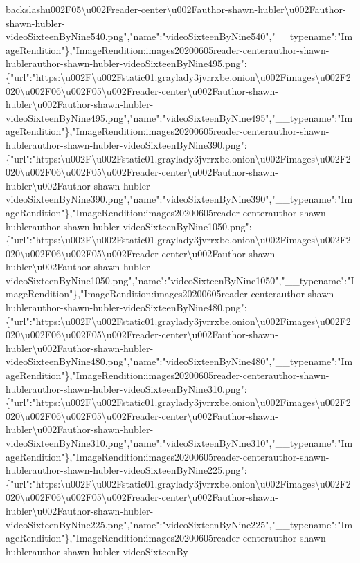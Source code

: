 backslash{}u002F05\textbackslash{}u002Freader-center\textbackslash{}u002Fauthor-shawn-hubler\textbackslash{}u002Fauthor-shawn-hubler-videoSixteenByNine540.png","name":"videoSixteenByNine540","\_\_typename":"ImageRendition"\},"ImageRendition:images20200605reader-centerauthor-shawn-hublerauthor-shawn-hubler-videoSixteenByNine495.png":\{"url":"https:\textbackslash{}u002F\textbackslash{}u002Fstatic01.graylady3jvrrxbe.onion\textbackslash{}u002Fimages\textbackslash{}u002F2020\textbackslash{}u002F06\textbackslash{}u002F05\textbackslash{}u002Freader-center\textbackslash{}u002Fauthor-shawn-hubler\textbackslash{}u002Fauthor-shawn-hubler-videoSixteenByNine495.png","name":"videoSixteenByNine495","\_\_typename":"ImageRendition"\},"ImageRendition:images20200605reader-centerauthor-shawn-hublerauthor-shawn-hubler-videoSixteenByNine390.png":\{"url":"https:\textbackslash{}u002F\textbackslash{}u002Fstatic01.graylady3jvrrxbe.onion\textbackslash{}u002Fimages\textbackslash{}u002F2020\textbackslash{}u002F06\textbackslash{}u002F05\textbackslash{}u002Freader-center\textbackslash{}u002Fauthor-shawn-hubler\textbackslash{}u002Fauthor-shawn-hubler-videoSixteenByNine390.png","name":"videoSixteenByNine390","\_\_typename":"ImageRendition"\},"ImageRendition:images20200605reader-centerauthor-shawn-hublerauthor-shawn-hubler-videoSixteenByNine1050.png":\{"url":"https:\textbackslash{}u002F\textbackslash{}u002Fstatic01.graylady3jvrrxbe.onion\textbackslash{}u002Fimages\textbackslash{}u002F2020\textbackslash{}u002F06\textbackslash{}u002F05\textbackslash{}u002Freader-center\textbackslash{}u002Fauthor-shawn-hubler\textbackslash{}u002Fauthor-shawn-hubler-videoSixteenByNine1050.png","name":"videoSixteenByNine1050","\_\_typename":"ImageRendition"\},"ImageRendition:images20200605reader-centerauthor-shawn-hublerauthor-shawn-hubler-videoSixteenByNine480.png":\{"url":"https:\textbackslash{}u002F\textbackslash{}u002Fstatic01.graylady3jvrrxbe.onion\textbackslash{}u002Fimages\textbackslash{}u002F2020\textbackslash{}u002F06\textbackslash{}u002F05\textbackslash{}u002Freader-center\textbackslash{}u002Fauthor-shawn-hubler\textbackslash{}u002Fauthor-shawn-hubler-videoSixteenByNine480.png","name":"videoSixteenByNine480","\_\_typename":"ImageRendition"\},"ImageRendition:images20200605reader-centerauthor-shawn-hublerauthor-shawn-hubler-videoSixteenByNine310.png":\{"url":"https:\textbackslash{}u002F\textbackslash{}u002Fstatic01.graylady3jvrrxbe.onion\textbackslash{}u002Fimages\textbackslash{}u002F2020\textbackslash{}u002F06\textbackslash{}u002F05\textbackslash{}u002Freader-center\textbackslash{}u002Fauthor-shawn-hubler\textbackslash{}u002Fauthor-shawn-hubler-videoSixteenByNine310.png","name":"videoSixteenByNine310","\_\_typename":"ImageRendition"\},"ImageRendition:images20200605reader-centerauthor-shawn-hublerauthor-shawn-hubler-videoSixteenByNine225.png":\{"url":"https:\textbackslash{}u002F\textbackslash{}u002Fstatic01.graylady3jvrrxbe.onion\textbackslash{}u002Fimages\textbackslash{}u002F2020\textbackslash{}u002F06\textbackslash{}u002F05\textbackslash{}u002Freader-center\textbackslash{}u002Fauthor-shawn-hubler\textbackslash{}u002Fauthor-shawn-hubler-videoSixteenByNine225.png","name":"videoSixteenByNine225","\_\_typename":"ImageRendition"\},"ImageRendition:images20200605reader-centerauthor-shawn-hublerauthor-shawn-hubler-videoSixteenBy